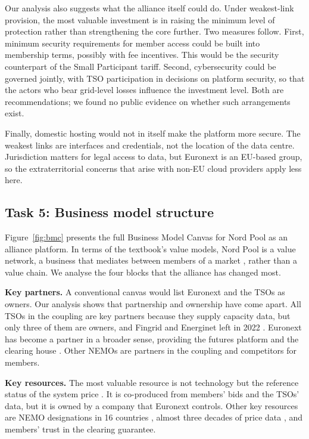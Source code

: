 Our analysis also suggests what the alliance itself could do. Under weakest-link provision, the most valuable investment is in raising the minimum level of protection rather than strengthening the core further. Two measures follow. First, minimum security requirements for member access could be built into membership terms, possibly with fee incentives. This would be the security counterpart of the Small Participant tariff. Second, cybersecurity could be governed jointly, with TSO participation in decisions on platform security, so that the actors who bear grid-level losses influence the investment level. Both are recommendations; we found no public evidence on whether such arrangements exist.

Finally, domestic hosting would not in itself make the platform more secure. The weakest links are interfaces and credentials, not the location of the data centre. Jurisdiction matters for legal access to data, but Euronext is an EU-based group, so the extraterritorial concerns that arise with non-EU cloud providers apply less here.

\subsection{Task 5: Business model structure}
\label{sec:t5}

Figure~\ref{fig:bmc} presents the full Business Model Canvas \citep[Sect.~19.2]{OverbyAudestad2021} for Nord Pool as an alliance platform. In terms of the textbook's value models, Nord Pool is a value network, a business that mediates between members of a market \citep[Def.~8.3]{OverbyAudestad2021}, rather than a value chain. We analyse the four blocks that the alliance has changed most.

\textbf{Key partners.} A conventional canvas would list Euronext and the TSOs as owners. Our analysis shows that partnership and ownership have come apart. All TSOs in the coupling are key partners because they supply capacity data, but only three of them are owners, and Fingrid and Energinet left in 2022 \citep{EPSOG2022}. Euronext has become a partner in a broader sense, providing the futures platform and the clearing house \citep{Euronext2026}. Other NEMOs are partners in the coupling and competitors for members.

\textbf{Key resources.} The most valuable resource is not technology but the reference status of the system price \citep{NPPrice}. It is co-produced from members' bids and the TSOs' data, but it is owned by a company that Euronext controls. Other key resources are NEMO designations in 16 countries \citep{NP2024}, almost three decades of price data \citep{NPData}, and members' trust in the clearing guarantee.

